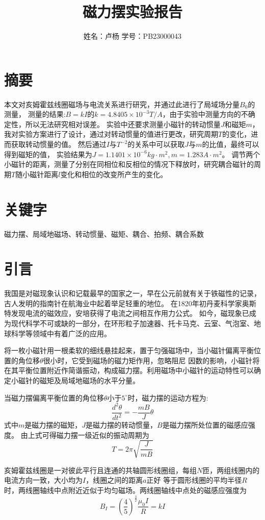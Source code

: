 \documentclass{article}
\title{磁力摆实验报告}
\author{姓名：卢杨 \quad 学号：PB23000043}
\begin{document}
\maketitle
\section*{摘要}
本文对亥姆霍兹线圈磁场与电流关系进行研究，并通过此进行了局域场分量$B_0$的测量，
测量的结果:$B=kI$的$k=4.8405\times 10^{-3}T/A$，由于实验中测量方向的不确定性，所以无法研究相对误差。
实验中还要求测量小磁针的转动惯量$J$和磁矩$m$，我对实验方案进行了设计，通过对转动惯量的值进行更改，研究周期$T$的变化，进而获取转动惯量的值。
然后通过$I$与$T^{-2}$的关系中可以获取$J$与$m$的比值，最终可以得到磁矩的值，
实验结果为$J=1.1401\times 10^{-6}kg\cdot m^2,m=1.283A\cdot m^2$。
调节两个小磁针的距离，测量了分别在同相位和反相位的情况下释放时，研究耦合磁针的周期$T$随小磁针距离$l$变化和相位的改变所产生的变化。
\section*{关键字}
磁力摆、局域地磁场、转动惯量、磁矩、耦合、拍频、耦合系数
\section{引言}
我国是对磁现象认识和记载最早的国家之一，早在公元前就有关于铁磁性的记录，古人发明的指南针在航海业中起着举足轻重的地位。
在1820年初丹麦科学家奥斯特发现电流的磁效应，安培获得了电流之间相互作用力公式。
如今，磁现象已成为现代科学不可或缺的一部分，在环形粒子加速器、托卡马克、云室、气泡室、地球科学等领域中有着广泛的应用。

将一枚小磁针用一根柔软的细线悬挂起来，置于匀强磁场中，当小磁针偏离平衡位置的角位移$\theta$很小时，它受到磁场的磁力矩作用，忽略阻尼
因数的影响，小磁针将在其平衡位置附近作简谐振动，构成磁力摆。利用磁场中小磁针的运动特性可以确定小磁针的磁矩及局域地磁场的水平分量。

当磁力摆偏离平衡位置的角位移$\theta$小于$5^\circ $时，磁力摆的运动方程为:
$$\frac{d^2\theta}{dt^2}=-\frac{mB}{J}\theta$$
式中$m$是磁力摆的磁矩，$J$是磁力摆的转动惯量，$B$是磁力摆所处位置的磁感应强度。
由上式可得磁力摆一级近似的振动周期为
\begin{equation}
    T=2\pi \sqrt{\frac{J}{mB}}
\end{equation}

亥姆霍兹线圈是一对彼此平行且连通的共轴圆形线圈组，每组$N$匝，两组线圈内的电流方向一致，大小均为$I$，线圈之间的距离$a$正好
等于圆形线圈的平均半径$R$时，两线圈轴线中点附近近似于均匀磁场。两线圈轴线中点处的磁感应强度为
\begin{equation}
    B_I={(\frac{4}{5})}^{\frac{3}{2}}\frac{\mu _0I}{R}=kI
\end{equation}
\end{document}
